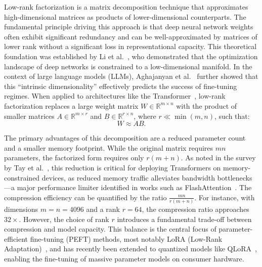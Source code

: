 Low-rank factorization is a matrix decomposition technique that approximates high-dimensional matrices as products of lower-dimensional counterparts. The fundamental principle driving this approach is that deep neural network weights often exhibit significant redundancy and can be well-approximated by matrices of lower rank without a significant loss in representational capacity. This theoretical foundation was established by Li et al.~\cite{li2018measuring}, who demonstrated that the optimization landscape of deep networks is constrained to a low-dimensional manifold. In the context of large language models (LLMs), Aghajanyan et al.~\cite{aghajanyan2020intrinsic} further showed that this ``intrinsic dimensionality'' effectively predicts the success of fine-tuning regimes. When applied to architectures like the Transformer~\cite{vaswani2017attention}, low-rank factorization replaces a large weight matrix $W \in \mathbb{R}^{m \times n}$ with the product of smaller matrices $A \in \mathbb{R}^{m \times r}$ and $B \in \mathbb{R}^{r \times n}$, where $r \ll \min(m,n)$, such that:
\begin{equation}
  W \approx AB.
  \label{eq:lowrank_basic}
\end{equation}

The primary advantages of this decomposition are a reduced parameter count and a smaller memory footprint. While the original matrix requires $mn$ parameters, the factorized form requires only $r(m+n)$. As noted in the survey by Tay et al.~\cite{tay2020efficient}, this reduction is critical for deploying Transformers on memory-constrained devices, as reduced memory traffic alleviates bandwidth bottlenecks—a major performance limiter identified in works such as FlashAttention~\cite{dao2022flashattention}. The compression efficiency can be quantified by the ratio $\frac{mn}{r(m+n)}$. For instance, with dimensions $m = n = 4096$ and a rank $r = 64$, the compression ratio approaches $32\times$. However, the choice of rank $r$ introduces a fundamental trade-off between compression and model capacity. This balance is the central focus of parameter-efficient fine-tuning (PEFT) methods, most notably LoRA (Low-Rank Adaptation)~\cite{hu2021lora}, and has recently been extended to quantized models like QLoRA~\cite{dettmers2023qlora}, enabling the fine-tuning of massive parameter models on consumer hardware.

